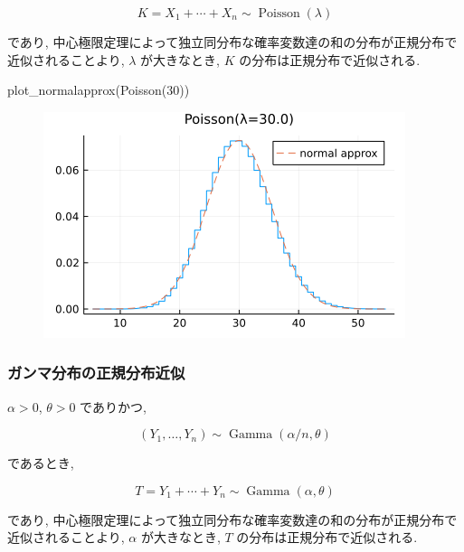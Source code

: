 \documentclass[
  letterpaper,
  DIV=11,
  numbers=noendperiod]{scrartcl}
\newenvironment{Shaded}{\begin{snugshade}}{\end{snugshade}}
\newcommand{\FloatTok}[1]{\textcolor[rgb]{0.68,0.00,0.00}{#1}}
\newcommand{\FunctionTok}[1]{\textcolor[rgb]{0.28,0.35,0.67}{#1}}
\newcommand{\NormalTok}[1]{\textcolor[rgb]{0.00,0.23,0.31}{#1}}
\begin{document}
\[
K = X_1 + \cdots + X_n \sim \operatorname{Poisson}(\lambda)
\]

であり,
中心極限定理によって独立同分布な確率変数達の和の分布が正規分布で近似されることより,
\(\lambda\) が大きなとき, \(K\) の分布は正規分布で近似される.

\begin{Shaded}
\begin{Highlighting}[]
\FunctionTok{plot\_normalapprox}\NormalTok{(}\FunctionTok{Poisson}\NormalTok{(}\FloatTok{30}\NormalTok{))}
\end{Highlighting}
\end{Shaded}

\begin{figure}[H]

{\centering \includegraphics{05 Central limit theorem_files/figure-pdf/cell-121-output-1.png}

}

\end{figure}

\hypertarget{ux30acux30f3ux30deux5206ux5e03ux306eux6b63ux898fux5206ux5e03ux8fd1ux4f3c}{%
\subsubsection{ガンマ分布の正規分布近似}\label{ux30acux30f3ux30deux5206ux5e03ux306eux6b63ux898fux5206ux5e03ux8fd1ux4f3c}}

\(\alpha > 0\), \(\theta > 0\) でありかつ,

\[
(Y_1,\ldots,Y_n) \sim \operatorname{Gamma}(\alpha/n, \theta)
\]

であるとき,

\[
T = Y_1 + \cdots + Y_n \sim \operatorname{Gamma}(\alpha, \theta)
\]

であり,
中心極限定理によって独立同分布な確率変数達の和の分布が正規分布で近似されることより,
\(\alpha\) が大きなとき, \(T\) の分布は正規分布で近似される.
\end{document}
